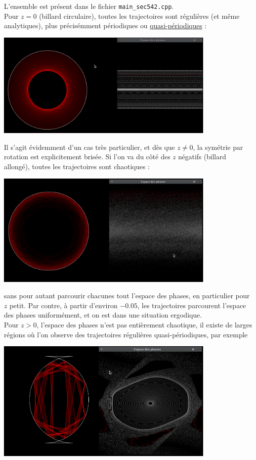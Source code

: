 \documentclass{book}
\def\filename{\texttt}
\begin{document}
\begin{correction}
L'ensemble est présent dans le fichier \filename{main\_sec542.cpp}.\\

Pour $z=0$ (billard circulaire), toutes les trajectoires sont régulières (et même analytiques), plus précisémment périodiques ou \href{https://en.wikipedia.org/wiki/Quasiperiodic_motion}{quasi-périodiques} :
\begin{center}
\includegraphics[width=0.8\textwidth]{TD5/trajectoires-esp-phase/traj-at-z=0.png}
\end{center}
Il s'agit évidemment d'un cas très particulier, et dès que $z\neq 0$, la symétrie par rotation est explicitement brisée. Si l'on va du côté des $z$ négatifs (billard allongé), toutes les trajectoires sont chaotiques :
\begin{center}
\includegraphics[width=0.8\textwidth]{TD5/trajectoires-esp-phase/traj-chaotique.png}
\end{center}
sans pour autant parcourir chacunes tout l'espace des phases, en particulier pour $z$ petit. Par contre, à partir d'environ $-0.05$, les trajectoires parcourent l'espace des phases uniformément, et on est dans une situation ergodique.\\
Pour $z>0$, l'espace des phases n'est pas entièrement chaotique, il existe de larges régions où l'on observe des trajectoires régulières quasi-périodiques, par exemple
\begin{center}
\includegraphics[width=0.8\textwidth]{TD5/trajectoires-esp-phase/traj-régulière-ordre-élevé.png}

\end{center}
\end{correction}
\end{document}
